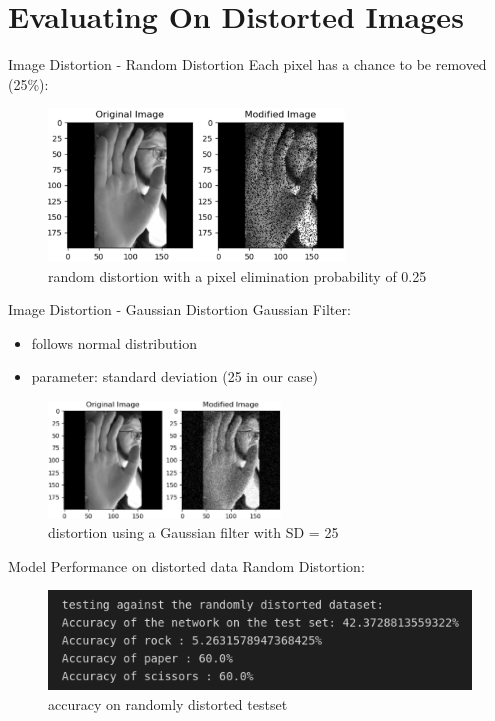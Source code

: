 \documentclass[aspectratio=169]{beamer}
\begin{document}
{\section{Evaluating On Distorted Images}
	\begin{frame}{Image Distortion - Random Distortion}
		Each pixel has a chance to be removed (25\%):
		\begin{figure}
			\centering
			\includegraphics[width=0.7\textwidth]{img/randomDistortion1.png}
			\caption{random distortion with a pixel elimination probability of 0.25}
		\end{figure}
	\end{frame}

	\begin{frame}{Image Distortion - Gaussian Distortion}
	Gaussian Filter:
		\begin{itemize}
			\item follows normal distribution
			\item parameter: standard deviation (25 in our case)
		\end{itemize}
	\pause
		\begin{figure}
			\centering
			\includegraphics[width=0.55\textwidth]{img/gaussianDistortion1.png}
			\caption{distortion using a Gaussian filter with SD = 25}
		\end{figure}
	\end{frame}
	
	
	\begin{frame}{Model Performance on distorted data}
		Random Distortion:
		\begin{figure}
			\centering
			\includegraphics[width=1\textwidth]{img/TestAccuracyRPS_rndDis_10.png}
			\caption{accuracy on randomly distorted testset}
		\end{figure}   
	\end{frame}

}
\end{document}
